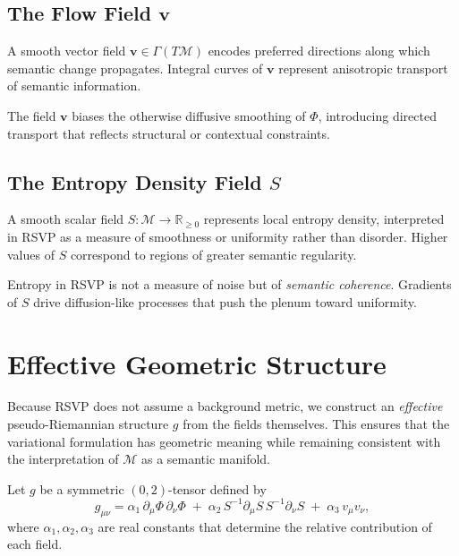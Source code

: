 \subsection{The Flow Field \texorpdfstring{$\mathbf{v}$}{v}}

\begin{definition}
A smooth vector field $\mathbf{v} \in \Gamma(T\mathcal{M})$ encodes preferred
directions along which semantic change propagates. Integral curves of
$\mathbf{v}$ represent anisotropic transport of semantic information.
\end{definition}

The field $\mathbf{v}$ biases the otherwise diffusive smoothing of $\Phi$,
introducing directed transport that reflects structural or contextual
constraints.

\subsection{The Entropy Density Field \texorpdfstring{$S$}{S}}

\begin{definition}
A smooth scalar field $S : \mathcal{M} \to \mathbb{R}_{\ge 0}$ represents local
entropy density, interpreted in RSVP as a measure of smoothness or uniformity
rather than disorder. Higher values of $S$ correspond to regions of greater
semantic regularity.
\end{definition}

Entropy in RSVP is not a measure of noise but of \emph{semantic coherence}.
Gradients of $S$ drive diffusion-like processes that push the plenum toward
uniformity.

\section{Effective Geometric Structure}

Because RSVP does not assume a background metric, we construct an
\emph{effective} pseudo-Riemannian structure $g$ from the fields themselves.
This ensures that the variational formulation has geometric meaning while
remaining consistent with the interpretation of $\mathcal{M}$ as a semantic
manifold.

\begin{definition}
Let $g$ be a symmetric $(0,2)$-tensor defined by
\[
g_{\mu\nu}
=
\alpha_1 \, \partial_\mu \Phi \, \partial_\nu \Phi
\;+\;
\alpha_2 \, S^{-1}\partial_\mu S \, S^{-1}\partial_\nu S
\;+\;
\alpha_3 \, v_\mu v_\nu ,
\]
where $\alpha_1,\alpha_2,\alpha_3$ are real constants that determine the
relative contribution of each field.
\]
\end{definition}

